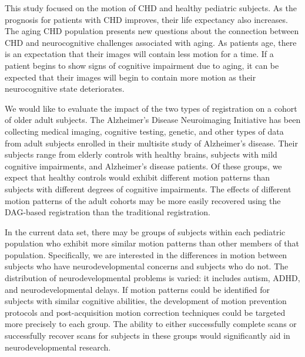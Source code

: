 This study focused on the motion of CHD and healthy pediatric subjects. As the prognosis for patients with CHD improves, their life expectancy also increases. The aging CHD population presents new questions about the connection between CHD and neurocognitive challenges associated with aging. As patients age, there is an expectation that their images will contain less motion for a time. If a patient begins to show signs of cognitive impairment due to aging, it can be expected that their images will begin to contain more motion as their neurocognitive state deteriorates. 

We would like to evaluate the impact of the two types of registration on a cohort of older adult subjects. The Alzheimer's Disease Neuroimaging Initiative has been collecting medical imaging, cognitive testing, genetic, and other types of data from adult subjects enrolled in their multisite study of Alzheimer's disease. Their subjects range from elderly controls with healthy brains, subjects with mild cognitive impairments, and Alzheimer's disease patients. Of these groups, we expect that healthy controls would exhibit different motion patterns than subjects with different degrees of cognitive impairments. The effects of different motion patterns of the adult cohorts may be more easily recovered using the DAG-based registration than the traditional registration.

In the current data set, there may be groups of subjects within each pediatric population who exhibit more similar motion patterns than other members of that population. Specifically, we are interested in the differences in motion between subjects who have neurodevelopmental concerns and subjects who do not. The distribution of neurodevelopmental problems is varied: it includes autism, ADHD, and neurodevelopmental delays. If motion patterns could be identified for subjects with similar cognitive abilities, the development of motion prevention protocols and post-acquisition motion correction techniques could be targeted more precisely to each group. The ability to either successfully complete scans or successfully recover scans for subjects in these groups would significantly aid in neurodevelopmental research.


